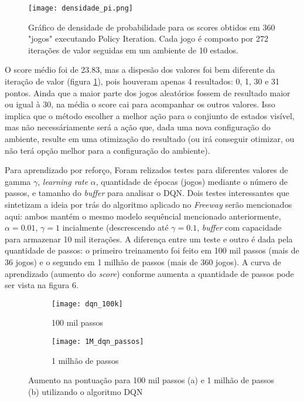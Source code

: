 \documentclass[letterpaper]{article} %
\begin{document}
\begin{figure}[h]
	\center
	\texttt{[image: densidade\_pi.png]}
    \caption{Gráfico de densidade de probabilidade para os scores obtidos em 360 "jogos" executando Policy Iteration. Cada jogo é composto por 272 iterações de valor seguidas em um ambiente de 10 estados.}
    \label{fig:densidade_pi}
\end{figure}


O score médio foi de 23.83, mas a dispesão dos valores foi bem diferente da iteração de valor (figura \ref{fig:densidade_pi}), pois houveram apenas 4 resultados: 0, 1, 30 e 31 pontos. Ainda que a maior parte dos jogos aleatórios fossem de resultado maior ou igual à 30, na média o score cai para acompanhar os outros valores. Isso implica que o método escolher a melhor ação para o conjiunto de estados visível, mas não necessáriamente será a ação que, dada uma nova configuração do ambiente, resulte em uma otimização do resultado (ou irá conseguir otimizar, ou não terá opção melhor para a configuração do ambiente).

Para aprendizado por reforço, 
Foram relizados testes para diferentes valores de gamma $\gamma$, \textit{learning rate} $\alpha$, quantidade de épocas (jogos) mediante o número de passos, e tamanho do \textit{buffer} para analisar o DQN. Dois testes interessantes que sintetizam a ideia por trás do algoritmo aplicado no \textit{Freeway} serão mencionados aqui: ambos mantém o mesmo modelo sequêncial mencionado anteriormente, $\alpha = 0.01$, $\gamma = 1$ incialmente (descrescendo até $\gamma = 0.1$, \textit{buffer} com capacidade para armazenar 10 mil iterações. A diferença entre um teste e outro é dada pela quantidade de passos: o primeiro treinamento foi feito em 100 mil passos (mais de 36 jogos) e o segundo em 1 milhão de passos (mais de 360 jogos). A curva de aprendizado (aumento do \textit{score}) conforme aumenta a quantidade de passos pode ser vista na figura 6.

\begin{figure}[h]
     \begin{subfigure}[h]{0.2\textwidth}
         \centering
         \texttt{[image: dqn\_100k]}
         \caption{100 mil passos}
     \end{subfigure}
     \hfill
     \begin{subfigure}[h]{0.2\textwidth}
         \texttt{[image: 1M\_dqn\_passos]}
         \caption{1 milhão de passos}
     \end{subfigure}
        \caption{Aumento na pontuação para 100 mil passos (a) e 1 milhão de passos (b) utilizando o algoritmo DQN}
\end{figure}
\end{document}
